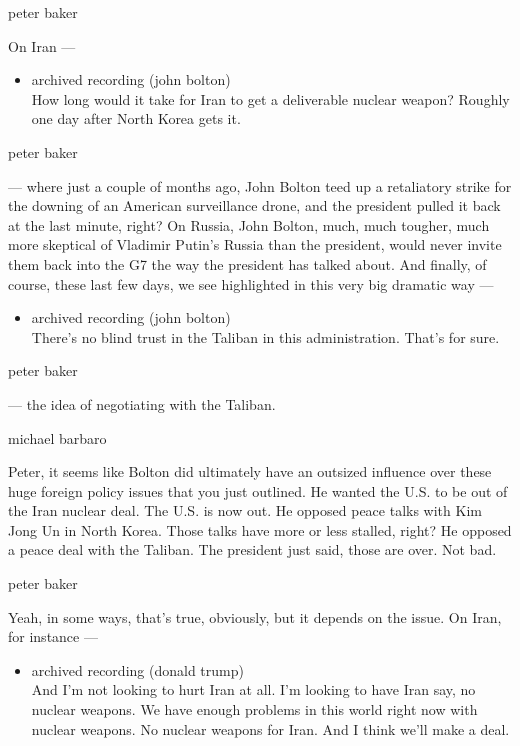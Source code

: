 peter baker

On Iran ---

\begin{itemize}
\tightlist
\item
  archived recording (john bolton)\\
  How long would it take for Iran to get a deliverable nuclear weapon?
  Roughly one day after North Korea gets it.
\end{itemize}

peter baker

--- where just a couple of months ago, John Bolton teed up a retaliatory
strike for the downing of an American surveillance drone, and the
president pulled it back at the last minute, right? On Russia, John
Bolton, much, much tougher, much more skeptical of Vladimir Putin's
Russia than the president, would never invite them back into the G7 the
way the president has talked about. And finally, of course, these last
few days, we see highlighted in this very big dramatic way ---

\begin{itemize}
\tightlist
\item
  archived recording (john bolton)\\
  There's no blind trust in the Taliban in this administration. That's
  for sure.
\end{itemize}

peter baker

--- the idea of negotiating with the Taliban.

michael barbaro

Peter, it seems like Bolton did ultimately have an outsized influence
over these huge foreign policy issues that you just outlined. He wanted
the U.S. to be out of the Iran nuclear deal. The U.S. is now out. He
opposed peace talks with Kim Jong Un in North Korea. Those talks have
more or less stalled, right? He opposed a peace deal with the Taliban.
The president just said, those are over. Not bad.

peter baker

Yeah, in some ways, that's true, obviously, but it depends on the issue.
On Iran, for instance ---

\begin{itemize}
\tightlist
\item
  archived recording (donald trump)\\
  And I'm not looking to hurt Iran at all. I'm looking to have Iran say,
  no nuclear weapons. We have enough problems in this world right now
  with nuclear weapons. No nuclear weapons for Iran. And I think we'll
  make a deal.
\end{itemize}

